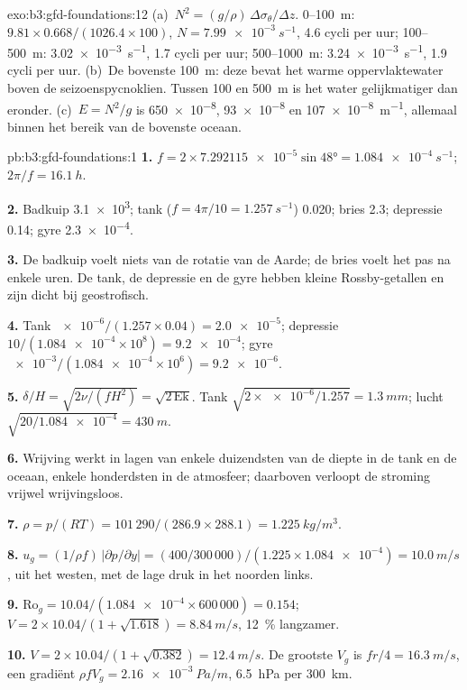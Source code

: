 \begin{solution}{exo:b3:gfd-foundations:12}
(a)~$N^2 = (g/\rho)\,\Delta\sigma_\theta/\Delta z$. 0--\qty{100}{m}:
$9.81\times0.668/(1026.4\times100)$, $N = \qty{7.99e-3}{s^{-1}}$, 4.6
cycli per uur; 100--\qty{500}{m}: \qty{3.02e-3}{s^{-1}}, 1.7 cycli per
uur; 500--\qty{1000}{m}: \qty{3.24e-3}{s^{-1}}, 1.9 cycli per uur.
(b)~De bovenste \qty{100}{m}: deze bevat het warme oppervlaktewater boven de
seizoenspycnoklien. Tussen 100 en \qty{500}{m} is het water
gelijkmatiger dan eronder. (c)~$E = N^2/g$ is \num{650e-8}, \num{93e-8} en
\qty{107e-8}{m^{-1}}, allemaal binnen het bereik van de bovenste oceaan.
\end{solution}

\begin{solution}{pb:b3:gfd-foundations:1}
\textbf{1.} $f = 2\times\num{7.292115e-5}\sin\ang{48} =
\qty{1.084e-4}{s^{-1}}$; $2\pi/f = \qty{16.1}{h}$.

\textbf{2.} Badkuip \num{3.1e3}; tank ($f = 4\pi/10 = \qty{1.257}{s^{-1}}$)
0.020; bries 2.3; depressie 0.14; gyre \num{2.3e-4}.

\textbf{3.} De badkuip voelt niets van de rotatie van de Aarde; de bries
voelt het pas na enkele uren. De tank, de depressie en de gyre hebben
kleine Rossby-getallen en zijn dicht bij geostrofisch.

\textbf{4.} Tank $\num{e-6}/(1.257\times0.04) = \num{2.0e-5}$; depressie
$10/(\num{1.084e-4}\times10^8) = \num{9.2e-4}$; gyre
$\num{e-3}/(\num{1.084e-4}\times10^6) = \num{9.2e-6}$.

\textbf{5.} $\delta/H = \sqrt{2\nu/(fH^2)} = \sqrt{2\,\mathrm{Ek}}$. Tank
$\sqrt{2\times\num{e-6}/1.257} = \qty{1.3}{mm}$; lucht $\sqrt{20/\num{1.084e-4}}
= \qty{430}{m}$.

\textbf{6.} Wrijving werkt in lagen van enkele duizendsten van de diepte in de
tank en de oceaan, enkele honderdsten in de atmosfeer; daarboven verloopt
de stroming vrijwel wrijvingsloos.

\textbf{7.} $\rho = p/(RT) = 101\,290/(286.9\times288.1) =
\qty{1.225}{kg/m^3}$.

\textbf{8.} $u_g = (1/\rho f)\,|\partial p/\partial y| = (400/300\,000)/(1.225
\times\num{1.084e-4}) = \qty{10.0}{m/s}$, uit het westen, met de lage
druk in het noorden links.

\textbf{9.} $\mathrm{Ro}_g = 10.04/(\num{1.084e-4}\times600\,000) = 0.154$;
$V = 2\times10.04/(1 + \sqrt{1.618}) = \qty{8.84}{m/s}$, \qty{12}{\percent}
langzamer.

\textbf{10.} $V = 2\times10.04/(1 + \sqrt{0.382}) = \qty{12.4}{m/s}$. De
grootste $V_g$ is $fr/4 = \qty{16.3}{m/s}$, een gradiënt $\rho fV_g =
\qty{2.16e-3}{Pa/m}$, \qty{6.5}{hPa} per \qty{300}{km}.


\end{solution}
